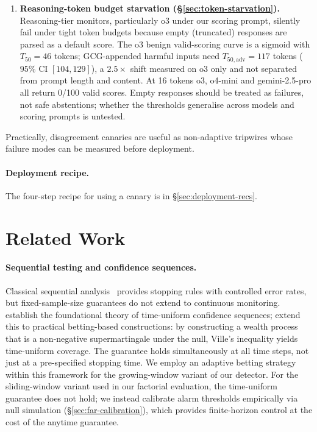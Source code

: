 \documentclass{article}
\begin{document}
\begin{enumerate}
\item \textbf{Reasoning-token budget starvation (\S\ref{sec:token-starvation}).} Reasoning-tier monitors, particularly o3 under our scoring prompt, silently fail under tight token budgets because empty (truncated) responses are parsed as a default score. The o3 benign valid-scoring curve is a sigmoid with $T_{50}=46$ tokens; GCG-appended harmful inputs need $T_{50,\text{adv}}=117$ tokens ($95\%$ CI $[104,129]$), a $2.5\times$ shift measured on o3 only and not separated from prompt length and content. At 16 tokens o3, o4-mini and gemini-2.5-pro all return 0/100 valid scores. Empty responses should be treated as failures, not safe abstentions; whether the thresholds generalise across models and scoring prompts is untested.
\end{enumerate}

\noindent Practically, disagreement canaries are useful as non-adaptive tripwires whose failure modes can be measured before deployment.

\paragraph{Deployment recipe.} The four-step recipe for using a canary is in \S\ref{sec:deployment-recs}.

\section{Related Work}
\label{sec:related}

\paragraph{Sequential testing and confidence sequences.} Classical sequential analysis~\citep{wald1945sequential} provides stopping rules with controlled error rates, but fixed-sample-size guarantees do not extend to continuous monitoring. \citet{howard2021timeuniform} establish the foundational theory of time-uniform confidence sequences; \citet{waudbysmith2024estimating} extend this to practical betting-based constructions: by constructing a wealth process that is a non-negative supermartingale under the null, Ville's inequality yields time-uniform coverage. The guarantee holds simultaneously at all time steps, not just at a pre-specified stopping time. We employ an adaptive betting strategy within this framework for the growing-window variant of our detector. For the sliding-window variant used in our factorial evaluation, the time-uniform guarantee does not hold; we instead calibrate alarm thresholds empirically via null simulation (\S\ref{sec:far-calibration}), which provides finite-horizon control at the cost of the anytime guarantee.
\end{document}
